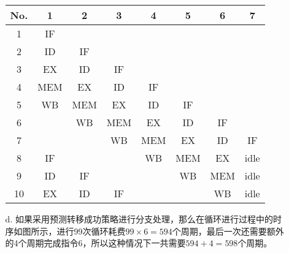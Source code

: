 \documentclass[UTF8,zihao=-4]{ctexart}
\begin{document}
\begin{enumerate}
\begin{enumerate}
			\begin{center}
				\begin{tabular}{|c|c|c|c|c|c|c|c|}
					\hline
					No. &  1  &  2  &  3  &  4  &  5  &  6  &  7   \\ \hline
					 1  & IF  &     &     &     &     &     &      \\
					 2  & ID  & IF  &     &     &     &     &      \\
					 3  & EX  & ID  & IF  &     &     &     &      \\
					 4  & MEM & EX  & ID  & IF  &     &     &      \\
					 5  & WB  & MEM & EX  & ID  & IF  &     &      \\
					 6  &     & WB  & MEM & EX  & ID  & IF  &      \\
					 7  &     &     & WB  & MEM & EX  & ID  &  IF  \\ \hline
					 8  & IF  &     &     & WB  & MEM & EX  & idle \\
					 9  & ID  & IF  &     &     & WB  & MEM & idle \\
					10  & EX  & ID  & IF  &     &     & WB  & idle \\ \hline
				\end{tabular}
			\end{center}
			\pagebreak
			\item[d.]如果采用预测转移成功策略进行分支处理，那么在循环进行过程中的时序如图所示，进行99次循环耗费$99\times 6=594$个周期，最后一次还需要额外的4个周期完成指令6，所以这种情况下一共需要$594+4=598$个周期。


\end{enumerate}
\end{enumerate}
\end{document}
